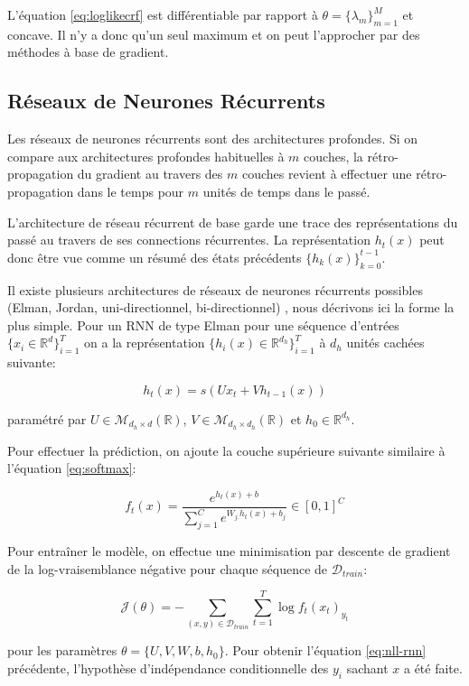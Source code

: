 L'équation \ref{eq:loglikecrf} est différentiable par rapport à $\theta=\lbrace
\lambda_m \rbrace_{m=1}^{M}$ et concave. Il n'y a donc qu'un seul maximum et on
peut l'approcher par des méthodes à base de gradient.

\subsection{Réseaux de Neurones Récurrents}

Les réseaux de neurones récurrents sont des architectures profondes. Si on
compare aux architectures profondes habituelles à $m$ couches, la rétro-propagation
du gradient au travers des $m$ couches revient à effectuer une
rétro-propagation dans le temps pour $m$ unités de temps dans le passé.

L'architecture de réseau récurrent de base \citep{rnn16} garde une trace des
représentations du passé au travers de ses connections récurrentes.  La
représentation $h_{t}(x)$ peut donc être vue comme un résumé des états
précédents $\lbrace h_{k}(x)\rbrace_{k=0}^{t-1}$.

Il existe plusieurs architectures de réseaux de neurones récurrents possibles
(Elman, Jordan, uni-directionnel, bi-directionnel) \citep{rnn15}, nous
décrivons ici la forme la plus simple. Pour un RNN de type Elman pour une séquence
d'entrées $\lbrace x_{i}\in\mathbb{R}^{d}\rbrace_{i=1}^{T}$ on a la
représentation $\lbrace h_{i}(x)\in\mathbb{R}^{d_h}\rbrace_{i=1}^{T}$ à $d_h$
unités cachées suivante:

\begin{equation}
h_t(x) = s(Ux_{t}+Vh_{t-1}(x))
\end{equation}

paramétré par $U\in\mathcal{M}_{d_h\times d}(\mathbb{R})$,
$V\in\mathcal{M}_{d_h\times d_h}(\mathbb{R})$ et $h_{0}\in\mathbb{R}^{d_h}$.

Pour effectuer la prédiction, on ajoute la couche supérieure suivante similaire à l'équation \ref{eq:softmax}:

\begin{equation}
f_{t}(x) = \frac{e^{ h_{t}(x) + b}}{\sum_{j=1}^C e^{W_{j.} h_{t}(x) + b_{j} }} \in [0,1]^{C}
\end{equation}

Pour entraîner le modèle, on effectue une minimisation par descente de gradient
de la log-vraisemblance négative pour chaque séquence de $\mathcal{D}_{train}$:

\begin{equation}
\label{eq:nll-rnn}
\mathcal{J}(\theta) = - \sum_{(x,y)\in\mathcal{D}_{train}} \sum_{t=1}^{T}\log f_{t}(x_{t})_{y_{t}}
\end{equation}

pour les paramètres $\theta=\lbrace U, V, W, b, h_{0}\rbrace$. Pour obtenir
l'équation \ref{eq:nll-rnn} précédente, l'hypothèse d'indépendance
conditionnelle des $y_i$ sachant $x$ a été faite.

